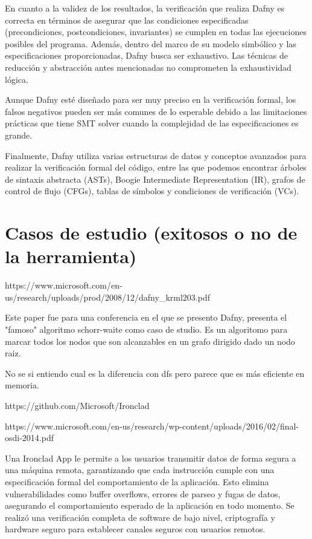\documentclass[runningheads]{llncs}
\begin{document}
En cuanto a la validez de los resultados, la verificación que realiza Dafny es correcta en términos de asegurar que las condiciones
especificadas (precondiciones, postcondiciones, invariantes) se cumplen en todas las ejecuciones posibles del programa. 
Además, dentro del marco de su modelo simbólico y las especificaciones proporcionadas,
Dafny busca ser exhaustivo. Las técnicas de reducción y abstracción antes mencionadas no comprometen la exhaustividad lógica.

Aunque Dafny esté diseñado para ser muy preciso en la verificación formal, 
los falsos negativos pueden ser más comunes de lo esperable debido a las limitaciones prácticas que tiene SMT solver
cuando la complejidad de las especificaciones es grande.

Finalmente, Dafny utiliza varias estructuras de datos y conceptos avanzados para realizar la verificación formal del código,
entre las que podemos encontrar árboles de sintaxis abstracta (ASTs), Boogie Intermediate Representation (IR), grafos de control de flujo (CFGs),
tablas de símbolos y condiciones de verificación (VCs).

\section{Casos de estudio (exitosos o no de la herramienta)}

https://www.microsoft.com/en-us/research/uploads/prod/2008/12/dafny\_krml203.pdf

Este paper fue para una conferencia en el que se presento Dafny, presenta el "famoso" algoritmo schorr-waite como caso de studio. Es un algoritomo para marcar todos los nodos que son alcanzables en un grafo dirigido dado un nodo raiz.

No se si entiendo cual es la diferencia con dfs pero parece que es más eficiente en memoria.


https://github.com/Microsoft/Ironclad

https://www.microsoft.com/en-us/research/wp-content/uploads/2016/02/final-osdi-2014.pdf

Una Ironclad App le permite a los usuarios transmitir datos de forma segura a una máquina remota, garantizando que cada instrucción cumple con una especificación formal del comportamiento de la aplicación. Esto elimina vulnerabilidades como buffer overflows, errores de parseo y fugas de datos, asegurando el comportamiento esperado de la aplicación en todo momento. Se realizó una verificación completa de software de bajo nivel, criptografía y hardware seguro para establecer canales seguros con usuarios remotos.
\end{document}
